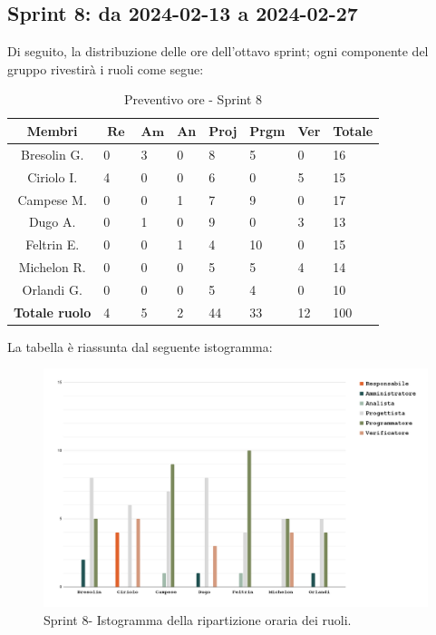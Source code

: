 \documentclass[10pt, a4paper]{article}
\begin{document}
\subsection{Sprint 8: da 2024-02-13 a 2024-02-27}
Di seguito, la distribuzione delle ore dell'ottavo sprint; ogni componente del gruppo rivestirà i ruoli come segue:
\begin{table}[H]
\begin{tabularx}{\textwidth}{c|X|X|X|X|X|X|X}
    \textbf{Membri} & $\operatorname{\textbf{Re}}$ & $\mathrm{\textbf{Am}}$ & \textbf{An} & \textbf{Proj} & \textbf{Prgm} & \textbf{Ver} & \textbf{Totale} \\
        \hline Bresolin G. & 0 & \cellcolor{primarycolor}3 & 0 & 8 & 5 & 0 & 16 \\
        \hline Ciriolo I.  & \cellcolor{primarycolor}4 & 0 & 0 & 6 & 0 & 5 & 15 \\
        \hline Campese M.  & 0 & 0 & 1 & 7 & \cellcolor{primarycolor}9 & 0 & 17 \\
        \hline Dugo A.     & 0 & 1 & 0 & \cellcolor{primarycolor}9 & 0 & 3 & 13 \\
        \hline Feltrin E.  & 0 & 0 & 1 & 4 & \cellcolor{primarycolor}10 & 0 & 15 \\
        \hline Michelon R. & 0 & 0 & 0 & 5 & 5 & \cellcolor{primarycolor}4 & 14 \\
        \hline Orlandi G.  & 0 & 0 & 0 & \cellcolor{primarycolor}5 & 4 & 0 & 10 \\
        \hline
        \textbf{Totale ruolo} & 4 & 5 & 2 & 44 & 33 & 12 & 100 
    \end{tabularx}
    \caption{Preventivo ore - Sprint 8}
    \end{table}

La tabella è riassunta dal seguente istogramma:
 \begin{figure}[H]
        \centering        
        \includegraphics[width=15.5cm]{istogrammi/istogramma_8_periodo.png}
        \caption{Sprint 8- Istogramma della ripartizione oraria dei ruoli. }
    \end{figure}
\end{document}
